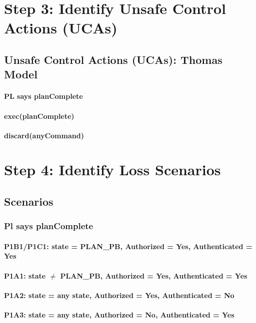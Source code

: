\documentclass[../../main/main.tex]{subfiles}
\begin{document}
\section{Step 3: Identify Unsafe Control Actions (UCAs)}\label{chp:stpapb:uca}
\subsection{Unsafe Control Actions (UCAs): Thomas Model}
\paragraph*{PL says planComplete}
\paragraph*{exec(planComplete)}
\paragraph*{discard(anyCommand)}

\section{Step 4: Identify Loss Scenarios}\label{chp:stpapb:scenarios}
\subsection{Scenarios}
\subsubsection*{Pl says planComplete}
\paragraph*{P1B1/P1C1: state = PLAN_PB, Authorized = Yes, Authenticated = Yes}
\paragraph*{P1A1: state  $\neq$ PLAN_PB, Authorized = Yes, Authenticated = Yes}
\paragraph*{P1A2: state  = any state, Authorized = Yes, Authenticated = No}
\paragraph*{P1A3: state  = any state, Authorized = No, Authenticated = Yes}
\end{document}
